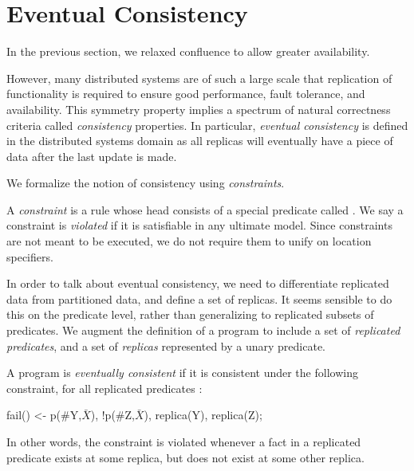 \section{Eventual Consistency}

In the previous section, we relaxed confluence to allow greater availability.

However, many distributed systems are of such a large scale that replication of functionality is required to ensure good performance, fault tolerance, and availability.  This symmetry property implies a spectrum of natural correctness criteria called {\em consistency} properties.  In particular, {\em eventual consistency} is defined in the distributed systems domain as all replicas will eventually have a piece of data after the last update is made.


We formalize the notion of consistency using {\em constraints}.

\begin{definition}
A {\em constraint} is a rule whose head consists of a special predicate called .  We say a constraint is {\em violated} if it is satisfiable in any ultimate model.  Since constraints are not meant to be executed, we do not require them to unify on location specifiers.
\end{definition}

In order to talk about eventual consistency, we need to differentiate replicated data from partitioned data, and define a set of replicas.  It seems sensible to do this on the predicate level, rather than generalizing to replicated subsets of predicates.  We augment the definition of a \lang program to include a set of {\em replicated predicates}, and a set of {\em replicas} represented by a unary  predicate.

\begin{definition}
\label{def:ec}
A \lang program is {\em eventually consistent} if it is consistent under the following constraint, for all replicated predicates :

\begin{Dedalus}
fail() <- p(#Y,\(\bar{X}\)), !p(#Z,\(\bar{X}\)), replica(Y), replica(Z);
\end{Dedalus}

In other words, the constraint is violated whenever a fact in a replicated predicate exists at some replica, but does not exist at some other replica.
\end{definition}

